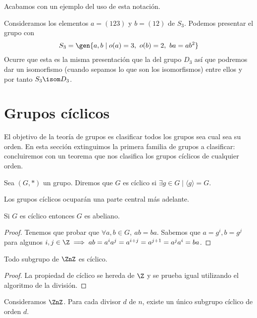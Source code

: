Acabamos con un ejemplo del uso de esta notación.

\begin{ej}
	Consideramos los elementos $a = (123)$ y $b = (12)$ de $S_3$. Podemos presentar el grupo con
	\begin{align*}
		S_3 = \gen{a, b \mid o(a) = 3,\ o(b) = 2,\ ba = ab^2}
	\end{align*}
	Ocurre que esta es la misma presentación que la del grupo $D_3$ así que podremos dar un isomorfismo (cuando sepamos lo que son los isomorfismos) entre ellos y por tanto $S_3 \isom D_3$.
\end{ej}


\section{Grupos cíclicos}

El objetivo de la teoría de grupos es clasificar todos los grupos sea cual sea su orden. En esta sección extinguimos la primera familia de grupos a clasificar: concluiremos con un teorema que nos clasifica los grupos cíclicos de cualquier orden.

\begin{dfn}
	Sea $(G, \ast)$ un grupo. Diremos que $G$ es cíclico si $\exists g \in G \mid \langle g \rangle = G$.
\end{dfn}

Los grupos cíclicos ocuparán una parte central más adelante.

\begin{thm}
	\label{thm:ciclicoimplicaabeliano}
	Si $G$ es cíclico entonces $G$ es abeliano.
\end{thm}

\begin{proof}
	Tenemos que probar que $\forall a,b \in G,\ ab = ba$. Sabemos que $a = g^i, b = g^j$ para algunos $i, j \in \Z \implies ab = a^i a^j = a^{i+j} = a^{j+1} = a^j a^i = ba$.
\end{proof}


\begin{pro}
	Todo subgrupo de $\ZnZ$ es cíclico.
\end{pro}

\begin{proof}
	La propiedad de cíclico se hereda de $\Z$ y se prueba igual utilizando el algoritmo de la división. %
\end{proof}

\begin{pro}
	Consideramos $\ZnZ$. Para cada divisor $d$ de $n$, existe un único subgrupo cíclico de orden $d$.
\end{pro}

